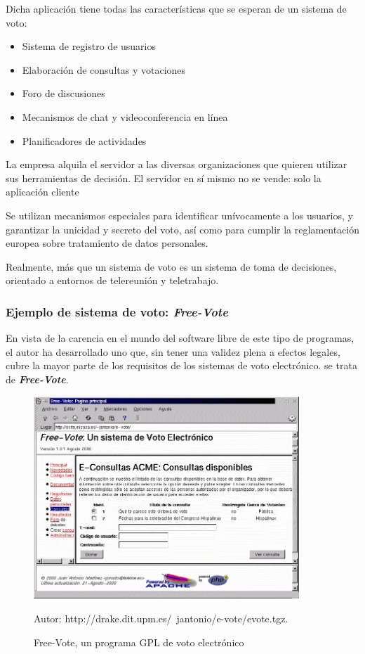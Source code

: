 Dicha aplicación tiene todas las características que se esperan de un sistema de voto:

\begin{itemize}
\item Sistema de registro de usuarios
\item Elaboración de consultas y votaciones
\item Foro de discusiones
\item Mecanismos de chat y videoconferencia en línea
\item Planificadores de actividades
\end{itemize}

La empresa alquila el servidor a las diversas organizaciones que quieren utilizar sus herramientas de decisión. El servidor en sí mismo no se vende: solo la aplicación cliente

Se utilizan mecanismos especiales para identificar unívocamente a los usuarios, y garantizar la unicidad y secreto del voto, así como para cumplir la reglamentación europea sobre tratamiento de datos personales.

Realmente, más que un sistema de voto es un sistema de toma de decisiones, orientado a entornos de telereunión y teletrabajo.

\subsubsection*{Ejemplo de sistema de voto: \textbf{\textit{Free-Vote}}}

En vista de la carencia en el mundo del software libre de este tipo de programas, el autor ha desarrollado uno que, sin tener una validez plena a efectos legales, cubre la mayor parte de los requisitos de los sistemas de voto electrónico. se trata de \textbf{\textit{Free-Vote}}.

\begin{figure}[H]
\centering
\includegraphics[width=10cm]{Figuras/free-vote.jpg}
\caption{Free-Vote, un programa GPL de voto electrónico }
Autor:  http://drake.dit.upm.es/~jantonio/e-vote/evote.tgz.
\end{figure}

